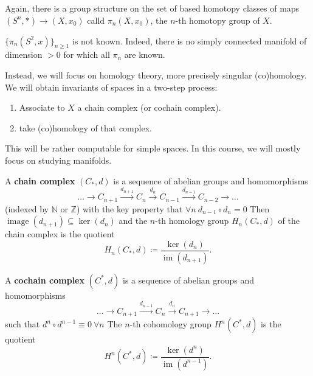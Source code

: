 \documentclass{article}
\DeclareMathOperator{\image}{image}
\DeclareMathOperator{\im}{im}
\begin{document}
Again, there is a group structure on the set of based homotopy classes of maps $(S^n, *) \to (X, x_0)$ calld $\pi_n(X, x_0)$, the $n$-th homotopy group of $X$.
\begin{fact}
  $\{\pi_n(S^2, x)\}_{n \geq 1}$ is not known. Indeed, there is no simply connected manifold of dimension $> 0$ for which all $\pi_n$ are known.
\end{fact}

Instead, we will focus on homology theory, more precisely singular (co)homology.
We will obtain invariants of spaces in a two-step process:
\begin{enumerate}[label=(\alph*)]
  \item Associate to $X$ a chain complex (or cochain complex).
  \item take (co)homology of that complex.
\end{enumerate}
This will be rather computable for simple spaces. In this course, we will mostly focus on studying manifolds.
\begin{defi}
  A \textbf{chain complex} $(C_*, d)$ is a sequence of abelian groups and homomorphisms
  \begin{equation*}
    \dots \longrightarrow C_{n+1} \overset{d_{n+1}}{\longrightarrow} C_n \overset{d_n}{\longrightarrow} C_{n-1} \overset{d_{n-1}}{\longrightarrow} C_{n-2} \longrightarrow \dots
  \end{equation*}
  (indexed by $\mathbb{N}$ or $\mathbb{Z}$) with the key property that $\forall n \ d_{n-1} \circ d_n = 0$
  Then $\image(d_{n+1}) \subseteq \ker(d_n)$ and the $n$-th homology group $H_n(C_*, d)$ of the chain complex is the quotient
  \begin{equation*}
    H_n(C_*, d) \coloneqq \frac{\ker(d_n)}{\im(d_{n+1})}.
  \end{equation*}

  A \textbf{cochain complex} $(C^*, d)$ is a sequence of abelian groups and homomorphisms
  \begin{equation*}
    \dots \longrightarrow C_{n+1} \overset{d_{n-1}}{\longrightarrow} C_n \overset{d_n}{\longrightarrow} C_{n+1} \longrightarrow \dots
  \end{equation*}
  such that $d^n \circ d^{n-1} \equiv 0 \ \forall n$
  The $n$-th cohomology group $H^n(C^*, d)$ is the quotient
  \begin{equation*}
    H^n(C^*, d) \coloneqq \frac{\ker(d^n)}{\im(d^{n-1})}.
  \end{equation*}
\end{defi}
\end{document}
